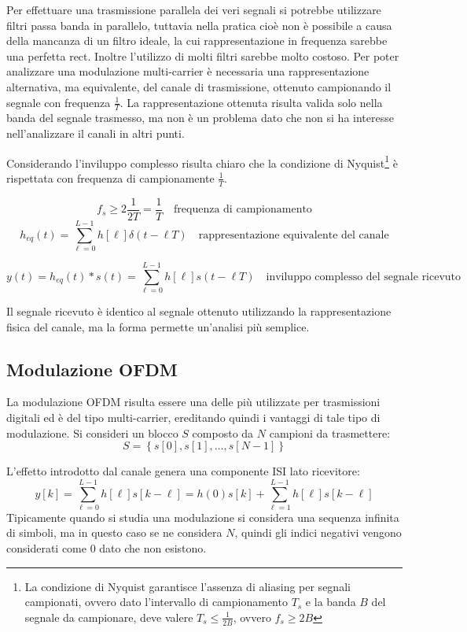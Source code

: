 Per effettuare una trasmissione parallela dei veri segnali si potrebbe utilizzare filtri passa banda in parallelo, tuttavia nella pratica cioè non è possibile a causa della mancanza di un filtro ideale, la cui rappresentazione in frequenza sarebbe una perfetta rect. Inoltre l'utilizzo di molti filtri sarebbe molto costoso.
Per poter analizzare una modulazione multi-carrier è necessaria una rappresentazione alternativa, ma equivalente, del canale di trasmissione, ottenuto campionando il segnale con frequenza $\frac{1}{T}$. La rappresentazione ottenuta risulta valida solo nella banda del segnale trasmesso, ma non è un problema dato che non si ha interesse nell'analizzare il canali in altri punti.

Considerando l'inviluppo complesso risulta chiaro che la condizione di Nyquist\footnote{\label{nyquist_cond} La condizione di Nyquist garantisce l'assenza di aliasing per segnali campionati, ovvero dato l'intervallo di campionamento $T_s$ e la banda $B$ del segnale da campionare, deve valere $T_s \leq \frac{1}{2B}$, ovvero $f_s \geq 2B$} è rispettata con frequenza di campionamente $\frac{1}{T}$.



\[
    f_s \geq 2 \frac{1}{2T} = \frac{1}{T} \quad \text{frequenza di campionamento} 
\]
\[
    h_{eq}(t) = \sum_{\ell=0}^{L-1} h \left[\ell\right] \delta(t - \ell T) \quad \text{rappresentazione equivalente del canale}
\]

\[
    y(t) = h_{eq}(t) \ast s(t) = \sum_{\ell=0}^{L-1} h\left[\ell\right] s(t - \ell T) \quad \text{inviluppo complesso del segnale ricevuto}
\]

Il segnale ricevuto è identico al segnale ottenuto utilizzando la rappresentazione fisica del canale, ma la forma permette un'analisi più semplice.


\subsection*{Modulazione OFDM}

La modulazione OFDM risulta essere una delle più utilizzate per trasmissioni digitali ed è del tipo multi-carrier, ereditando quindi i vantaggi di tale tipo di modulazione.
Si consideri un blocco $S$ composto da $N$ campioni da trasmettere:
\[
  S = \left\{s\left[0\right], s\left[1\right], \ldots, s\left[N-1\right]\right\}
\]

L'effetto introdotto dal canale genera una componente ISI lato ricevitore:
\[
  y\left[k\right] = \sum_{\ell=0}^{L-1} h\left[\ell\right] s\left[k - \ell\right] = h(0)s\left[k\right] + \sum_{\ell=1}^{L-1} h\left[\ell\right] s\left[k - \ell\right]
\]
Tipicamente quando si studia una modulazione si considera una sequenza infinita di simboli, ma in questo caso se ne considera $N$, quindi gli indici negativi vengono considerati come 0 dato che non esistono.


